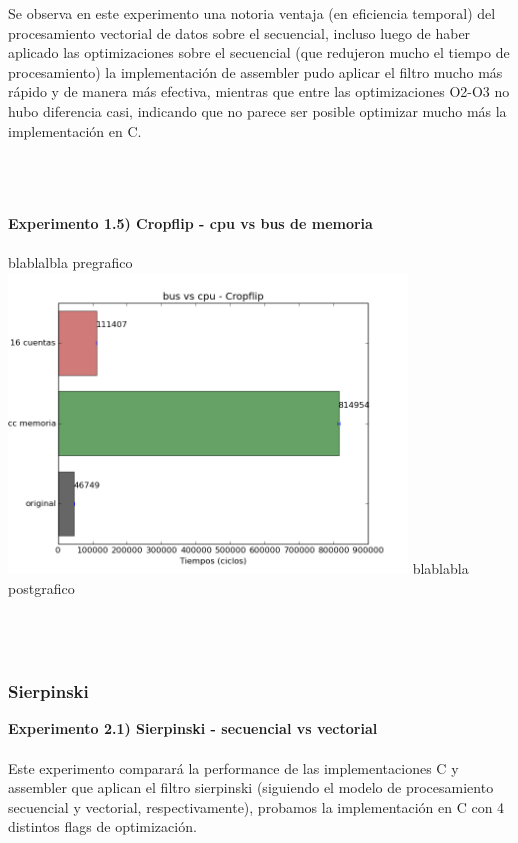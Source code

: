 \documentclass[a4paper]{article}
\begin{document}
Se observa en este experimento una notoria ventaja (en eficiencia temporal) del procesamiento vectorial de datos sobre el secuencial, incluso luego de haber aplicado las optimizaciones sobre el secuencial (que redujeron mucho el tiempo de procesamiento) la implementaci\'{o}n de assembler pudo aplicar el filtro mucho m\'{a}s r\'{a}pido y de manera m\'{a}s efectiva, mientras que entre las optimizaciones O2-O3 no hubo diferencia casi, indicando que no parece ser posible optimizar mucho m\'{a}s la implementaci\'{o}n en C.\\ \\ \\ \\

\newpage

\textbf{Experimento 1.5) Cropflip - cpu vs bus de memoria}\\ \\

blablalbla pregrafico
\includegraphics[width=300pt]{imagenes/bvmcrop.png}
blablabla postgrafico \\ \\ \\ \\

\subsubsection{Sierpinski}

\textbf{Experimento 2.1) Sierpinski - secuencial vs vectorial}\\ \\

Este experimento comparar\'{a} la performance de las implementaciones C y assembler que aplican el filtro sierpinski (siguiendo el modelo de procesamiento secuencial y vectorial, respectivamente), probamos la implementaci\'{o}n en C con 4 distintos flags de optimizaci\'{o}n.
\end{document}
